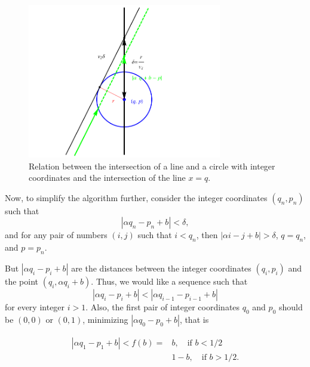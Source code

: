\documentclass{iopart}
\begin{document}
\begin{figure}
\centering
\includegraphics [width=240pt]{fig01.pdf}
\caption{Relation between the intersection of a line and a circle with integer coordinates and the intersection of the line $x = q$. }
\label{fig:circle}
\end{figure}


Now, to simplify the algorithm further, consider the integer coordinates $(q_n, p_n)$ such that
\begin{equation}
|\alpha q_n -p_n + b|< \delta,
\label{eq:1}
\end{equation}
and for any pair of numbers $(i,j)$ such that $i<q_n$, then $|\alpha i -j+ b|> \delta$,  $q=q_n$, and $p=p_n$. 
 
But $|\alpha q_i - p_i + b|$ are the distances between the integer coordinates $(q_i, p_i)$ and the point $( q_i ,\alpha q_i + b)$. Thus, we would like a sequence such that  
\begin{equation}
|\alpha q_i - p_i + b|<|\alpha q_{i-1} - p_{i-1} + b|
\label{eq:iteration}
\end{equation}
for every integer $i>1$. Also, the first pair of integer coordinates $q_0$ and $p_0$ should be $(0, 0)$ or $(0, 1)$, minimizing $| \alpha q_0 - p_0 + b |$, that is

\begin{eqnarray}
|\alpha q_1 -p_1 + b|< f(b) =& b,  \quad \mbox{if } b < 1/2 \\ 
& 1-b,  \quad \mbox{if } b > 1/2.
\label{eq:prima}
\end{eqnarray}
\end{document}
